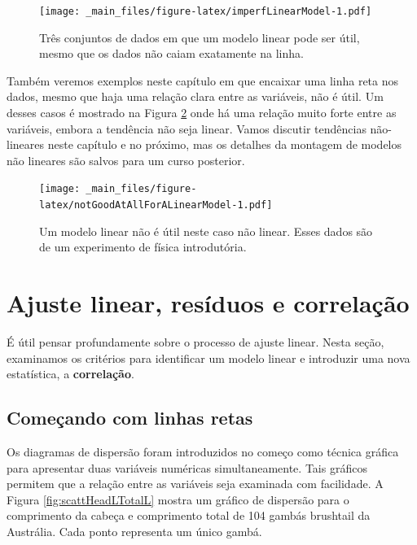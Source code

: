 \documentclass[
]{book}
\theoremstyle{definition}
\theoremstyle{definition}
\theoremstyle{definition}
\theoremstyle{definition}
\theoremstyle{remark}
\begin{document}
\begin{figure}
\centering
\texttt{[image: \_main\_files/figure-latex/imperfLinearModel-1.pdf]}
\caption{\label{fig:imperfLinearModel} Três conjuntos de dados em que um modelo linear pode ser útil, mesmo que os dados não caiam exatamente na linha.}
\end{figure}

Também veremos exemplos neste capítulo em que encaixar uma linha reta nos dados, mesmo que haja uma relação clara entre as variáveis, não é útil. Um desses casos é mostrado na Figura \ref{fig:notGoodAtAllForALinearModel} onde há uma relação muito forte entre as variáveis, embora a tendência não seja linear. Vamos discutir tendências não-lineares neste capítulo e no próximo, mas os detalhes da montagem de modelos não lineares são salvos para um curso posterior.

\begin{figure}
\centering
\texttt{[image: \_main\_files/figure-latex/notGoodAtAllForALinearModel-1.pdf]}
\caption{\label{fig:notGoodAtAllForALinearModel}Um modelo linear não é útil neste caso não linear. Esses dados são de um experimento de física introdutória.}
\end{figure}

\hypertarget{lineFittingResidualsCorrelation}{%
\section{Ajuste linear, resíduos e correlação}\label{lineFittingResidualsCorrelation}}

É útil pensar profundamente sobre o processo de ajuste linear. Nesta seção, examinamos os critérios para identificar um modelo linear e introduzir uma nova estatística, a \textbf{correlação}.

\hypertarget{startingWithStraightLines}{%
\subsection{Começando com linhas retas}\label{startingWithStraightLines}}

Os diagramas de dispersão foram introduzidos no começo como técnica gráfica para apresentar duas variáveis numéricas simultaneamente. Tais gráficos permitem que a relação entre as variáveis seja examinada com facilidade. A Figura \ref{fig:scattHeadLTotalL} mostra um gráfico de dispersão para o comprimento da cabeça e comprimento total de 104 gambás brushtail da Austrália. Cada ponto representa um único gambá.
\end{document}
